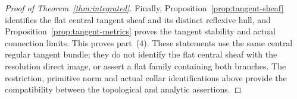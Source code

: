 \begin{proof}[Proof of Theorem~\ref{thm:integrated}]
Finally, Proposition~\ref{prop:tangent-sheaf} identifies the flat
central tangent sheaf and its distinct reflexive hull, and
Proposition~\ref{prop:tangent-metrics} proves the tangent stability
and actual connection limits. This proves part~(4). These statements
use the same central regular tangent bundle; they do not identify
the flat central sheaf with the resolution direct image, or assert a
flat family containing both branches. The restriction, primitive norm
and actual collar identifications above provide the compatibility
between the topological and analytic assertions.
\end{proof}
